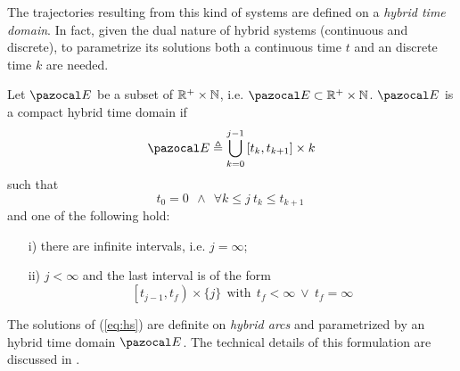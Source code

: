 %
The trajectories resulting from this kind of systems are defined on a \textit{hybrid time domain}. In fact, given the dual nature of hybrid systems (continuous and discrete), to parametrize its solutions both a continuous time $t$ and an discrete time $k$ are needed.
%
\begin{defn}
    Let $\E$ be a subset of $\mathbb{R}^+\times\mathbb{N}$, i.e. $\E\subset\R^+\times\mathbb{N}$. $\E$ is a compact hybrid time domain if 
    \begin{equation}
        \E\triangleq\bigcup_{k = 0}^{j-1}\left[t_k,t_{k+1}\right]\times {k} 
    \end{equation}
    such that
    \begin{equation}
        t_0 = 0~~\land~~\forall k\leq j~t_k\leq t_{k+1}~
    \end{equation}
    and one of the following hold:
    \begin{itemize}
        \item [i)] there are infinite intervals, i.e. $j = \infty$;
        \item [ii)] $j<\infty$ and the last interval is of the form
        \begin{equation}
            \left[t_{j-1},t_f\right)\times \{j\}~~\text{with}~~t_f<\infty~\lor~t_f = \infty
        \end{equation}
    \end{itemize}
\end{defn}
%
The solutions of (\ref{eq:hs}) are definite on \textit{hybrid arcs} and parametrized by an hybrid time domain $\E$. The technical details of this formulation are discussed in \citep{Goebel2012}. 
%
